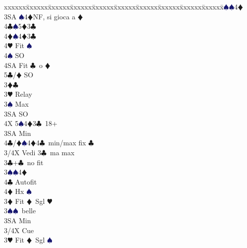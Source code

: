 \documentclass[a4paper,italian]{article}
\newcommand{\BC}{\textcolor{OliveGreen}{$\clubsuit$}}
\newcommand{\BD}{\textcolor{RedOrange}{$\vardiamondsuit$}}
\newcommand{\BH}{\textcolor{Red2}{$\varheartsuit${}}}
\newcommand{\BS}{\textcolor{MidnightBlue}{$\spadesuit${}}}
\newenvironment{bidtable}
{\begin{tabbing}

    xxxxxx\=xxxxxx\=xxxxxx\=xxxxxx\=xxxxxx\=xxxxxx\=xxxxxx\=xxxxxx\=xxxxxx\=xxxxxx\=\kill}
{\end{tabbing} }%
\begin{document}
\begin{multicols}{2}
\begin{bidtable}
                                            3\BS {}\BS 4\BD \\
                                            3SA \BS 4\BD NF, si gioca a \BD \\
                                            4\BC {}\BS 5\BD 3\BC \\
                                            4\BD {}\BS 4\BD 3\BC \+\\
                                            4\BH \> Fit \BS\\
                                            4\BS \> SO \\
                                            4SA \> Fit \BC\ o \BD \\
                                            5\BC/\BD \> SO\-\-\-\\
                                            3\BD {}\BC \+\\
                                            3\BH \> Relay\+\\
                                            3\BS \> Max\+\\
                                            3SA \> SO\+\\
                                            4X 5\BS 4\BD 3\BC\ 18+\-\-\\
                                            3SA \> Min\\
                                            4\BC/\BD {}\BS 4\BD 4\BC\ min/max fix \BC \-\-\\
                                            3/4X \> Vedi 3\BC\ ma max\-\\
                                            3\BC {}+\BC\ no fit\+\\
                                            3\BS{}\BS 4\BD \+\\
                                            4\BC \> Autofit\\
                                            4\BD \> Hx \BS \-\-\\
                                            3\BD \> Fit \BD\ Sgl \BH \+\\
                                            3\BS {}\BS\ belle\\
                                            3SA \> Min\\
                                            3/4X \> Cue\-\\
                                            3\BH \> Fit \BD\ Sgl \BS \+\\

\end{bidtable}
\end{multicols}
\end{document}
